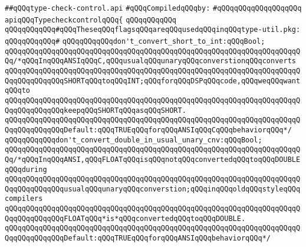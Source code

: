 \label{src/lib/c-kit/src/variants/type-check-control.api}
\verb|##qQQqtype-check-control.api|\newline
\newline
\verb|#qQQqCompiledqQQqby:|\newline
\verb|#qQQqqQQqqQQqqQQqqQQq|\newline
\newline
\verb|apiqQQqTypecheckcontrolqQQq{|\newline
\verb|qQQqqQQqqQQq|\newline
\verb|qQQqqQQqqQQq#qQQqTheseqQQqflagsqQQqareqQQqusedqQQqinqQQqtype-util.pkg:|\newline
\verb|qQQqqQQqqQQq#|\newline
\verb|qQQqqQQqqQQqdon't_convert_short_to_int:qQQqBool;|\newline
\verb|qQQqqQQqqQQqqQQqqQQqqQQqqQQqqQQqqQQqqQQqqQQqqQQqqQQqqQQqqQQqqQQqqQQqqQQq/*qQQqInqQQqANSIqQQqC,qQQqusualqQQqunaryqQQqconverstionqQQqconverts|\newline
\verb|qQQqqQQqqQQqqQQqqQQqqQQqqQQqqQQqqQQqqQQqqQQqqQQqqQQqqQQqqQQqqQQqqQQqqQQqqQQqqQQqqQQqSHORTqQQqtoqQQqINT;qQQqforqQQqDSPqQQqcode,qQQqweqQQqwantqQQqto|\newline
\verb|qQQqqQQqqQQqqQQqqQQqqQQqqQQqqQQqqQQqqQQqqQQqqQQqqQQqqQQqqQQqqQQqqQQqqQQqqQQqqQQqqQQqkeepqQQqSHORTqQQqasqQQqSHORT.|\newline
\verb|qQQqqQQqqQQqqQQqqQQqqQQqqQQqqQQqqQQqqQQqqQQqqQQqqQQqqQQqqQQqqQQqqQQqqQQqqQQqqQQqqQQqDefault:qQQqTRUEqQQqforqQQqANSIqQQqCqQQqbehaviorqQQq*/|\newline
\newline
\verb|qQQqqQQqqQQqdon't_convert_double_in_usual_unary_cnv:qQQqBool;|\newline
\verb|qQQqqQQqqQQqqQQqqQQqqQQqqQQqqQQqqQQqqQQqqQQqqQQqqQQqqQQqqQQqqQQqqQQqqQQq/*qQQqInqQQqANSI,qQQqFLOATqQQqisqQQqnotqQQqconvertedqQQqtoqQQqDOUBLEqQQqduring|\newline
\verb|qQQqqQQqqQQqqQQqqQQqqQQqqQQqqQQqqQQqqQQqqQQqqQQqqQQqqQQqqQQqqQQqqQQqqQQqqQQqqQQqqQQqusualqQQqunaryqQQqconverstion;qQQqinqQQqoldqQQqstyleqQQqcompilers|\newline
\verb|qQQqqQQqqQQqqQQqqQQqqQQqqQQqqQQqqQQqqQQqqQQqqQQqqQQqqQQqqQQqqQQqqQQqqQQqqQQqqQQqqQQqFLOATqQQq*is*qQQqconvertedqQQqtoqQQqDOUBLE.|\newline
\verb|qQQqqQQqqQQqqQQqqQQqqQQqqQQqqQQqqQQqqQQqqQQqqQQqqQQqqQQqqQQqqQQqqQQqqQQqqQQqqQQqqQQqDefault:qQQqTRUEqQQqforqQQqANSIqQQqbehaviorqQQq*/|\newline
